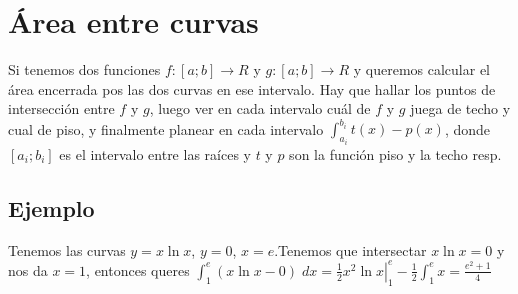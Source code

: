 \documentclass{article}
\begin{document}
\section{Área entre curvas}
Si tenemos dos funciones $f : [a; b] \to R$ y $g : [a; b] \to R$ y
queremos calcular el área encerrada pos las dos curvas en ese intervalo.
Hay que hallar los puntos de intersección entre $f$ y $g$, luego ver en cada
intervalo cuál de $f$ y $g$ juega de techo y cual de piso, y finalmente
planear en cada intervalo \(
\int_{a_i}^{b_i} t(x) - p(x)
\), donde $[a_i; b_i]$ es el intervalo entre las raíces y $t$ y $p$ son la
función piso y la techo resp.

\subsection{Ejemplo}
Tenemos las curvas $y = x \ln x$, $y = 0$, $x = e$.Tenemos que intersectar
$x \ln x = 0$ y nos da $x = 1$, entonces queres \(
\int_1^e (x \ln x - 0) \; dx = \left.\frac{1}{2}x^2\ln x\right|_1^e -
	\frac{1}{2}\int_1^e x = \frac{e^2 + 1}{4}
\)
\end{document}
